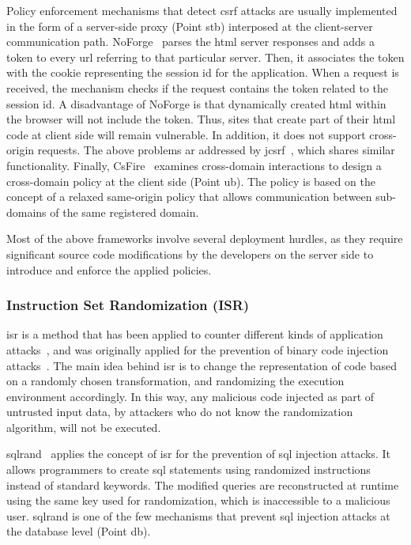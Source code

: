 \documentclass[conference]{IEEEtran}
\begin{document}
Policy enforcement mechanisms that detect {\sc csrf}
attacks are usually implemented in the form of a
server-side proxy (Point {\sc s}t{\sc b})
interposed at the client-server communication path.
NoForge~\cite{JKK06a}
parses the {\sc html} server responses
and adds a token to every {\sc url} referring to that particular
server. Then, it associates the token with the cookie
representing the session {\sc id} for the application.
When a request is received, the mechanism checks
if the request contains the token related
to the session {\sc id}. A disadvantage of NoForge
is that  dynamically created {\sc html} within
the browser will not include the token.
Thus, sites that create part of their {\sc html} code at client side
will remain vulnerable. In addition, it does not
support cross-origin requests.
The above problems ar addressed by j{\sc csrf}~\cite{PS11},
which shares similar functionality.
Finally, CsFire~\cite{DDHPJ10}
examines cross-domain interactions to design a
cross-domain policy at the client side (Point {\sc ub}).
The policy is based on the concept of a relaxed
same-origin policy that allows communication between
sub-domains of the same registered domain.

Most of the above frameworks involve
several deployment hurdles, as they
require significant source code modifications by the
developers on the server side to introduce and enforce
the applied policies.

\subsubsection{Instruction Set Randomization (ISR)}

{\sc isr} is a method that has been applied to counter different kinds
of application attacks~\cite{K09b}, and was originally applied for the
prevention of binary code injection attacks~\cite{KKP03, isr03forrest}.
The main idea behind {\sc isr} is
to change the representation of code
based on a randomly chosen transformation,
and randomizing the execution environment accordingly.
In this way, any malicious code injected as part of untrusted input data,
by attackers who do not know the randomization algorithm,
will not be executed.

{\sc sql}rand~\cite{BK04} applies the concept of {\sc isr} for the prevention
of {\sc sql} injection attacks. It allows programmers to create {\sc sql}
statements using randomized instructions instead of standard keywords.
The modified queries are reconstructed at runtime using the same key
used for randomization, which is inaccessible to a malicious user.
{\sc sql}rand is one of the few mechanisms that prevent {\sc sql}
injection attacks at the database level (Point {\sc db}).
\end{document}
